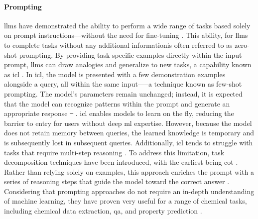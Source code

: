 \documentclass[11pt, oneside]{article}
\makeatletter
\providecommand{\DIFaddtex}[1]{{\protect\color{blue}\uwave{#1}}} %
\providecommand{\DIFdeltex}[1]{{\protect\color{red}\sout{#1}}} %
\providecommand{\DIFaddbegin}{} %
\providecommand{\DIFaddend}{} %
\providecommand{\DIFdelbegin}{} %
\providecommand{\DIFdelend}{} %
\providecommand{\DIFadd}[1]{\texorpdfstring{\DIFaddtex{#1}}{#1}} %
\providecommand{\DIFdel}[1]{\texorpdfstring{\DIFdeltex{#1}}{}} %
\newcommand{\DIFscaledelfig}{0.5}
\newlength{\DIFdelgraphicswidth} %
\newlength{\DIFdelgraphicsheight} %
\newcommand{\DIFaddincludegraphics}[2][]{{\color{blue}\fbox{\DIFOincludegraphics[#1]{#2}}}} %
\newcommand{\DIFdelincludegraphics}[2][]{%
\sbox{\DIFdelgraphicsbox}{\DIFOincludegraphics[#1]{#2}}%
\settoboxwidth{\DIFdelgraphicswidth}{\DIFdelgraphicsbox} %
\settoboxtotalheight{\DIFdelgraphicsheight}{\DIFdelgraphicsbox} %
\scalebox{\DIFscaledelfig}{%
\parbox[b]{\DIFdelgraphicswidth}{\usebox{\DIFdelgraphicsbox}\\[-\baselineskip] \rule{\DIFdelgraphicswidth}{0em}}\llap{\resizebox{\DIFdelgraphicswidth}{\DIFdelgraphicsheight}{%
\setlength{\unitlength}{\DIFdelgraphicswidth}%
\begin{picture}(1,1)%
\thicklines\linethickness{2pt} %
{\color[rgb]{1,0,0}\put(0,0){\framebox(1,1){}}}%
{\color[rgb]{1,0,0}\put(0,0){\line( 1,1){1}}}%
{\color[rgb]{1,0,0}\put(0,1){\line(1,-1){1}}}%
\end{picture}%
}\hspace*{3pt}}} %
} %
\DeclareRobustCommand{\DIFaddbegin}{\DIFOaddbegin \let\includegraphics\DIFaddincludegraphics} %
\DeclareRobustCommand{\DIFaddend}{\DIFOaddend \let\includegraphics\DIFOincludegraphics} %
\DeclareRobustCommand{\DIFdelbegin}{\DIFOdelbegin \let\includegraphics\DIFdelincludegraphics} %
\DeclareRobustCommand{\DIFdelend}{\DIFOaddend \let\includegraphics\DIFOincludegraphics} %
\let\sout@orig\sout %
\renewcommand{\sout}[1]{\ifmmode\text{\sout@orig{\ensuremath{#1}}}\else\sout@orig{#1}\fi} %
\makeatother
\begin{document}
\paragraph{Prompting}\label{sec:prompting} \glspl{llm} have demonstrated the ability to perform a wide range of tasks based solely on prompt instructions---without the need for fine-tuning \autocite{radford2019language}. 
This ability, for \glspl{llm} to complete tasks without any additional information\DIFaddbegin \DIFadd{, }\DIFaddend is often referred to as zero-shot prompting.
By providing task-specific examples directly within the input prompt, \glspl{llm} can draw analogies and generalize to new tasks, a capability known as \gls{icl} \autocite{brown2020language, chowdhery2023palm, openai2023gpt04}. 
In \gls{icl}, the model is presented with a few demonstration examples alongside a query, all within the same input—--a technique known as few-shot prompting. 
The model's parameters remain unchanged; instead, it is expected that the model can recognize patterns within the prompt and generate an appropriate response \DIFdelbegin \DIFdel{\mbox{%
\cite{von2023transformers}}\hskip0pt%
}\DIFdelend \DIFaddbegin \autocite{von2023transformers}\DIFaddend . \gls{icl} enables models to learn on the fly, reducing the barrier to entry for users without deep \gls{ml} expertise. 
However, because the model does not retain memory between queries, the learned knowledge is temporary and is subsequently lost in subsequent queries. 
Additionally, \gls{icl} tends to struggle with tasks that require multi-step reasoning \autocite{brown2020language}. 
To address this limitation, task decomposition techniques have been introduced, with the earliest being \gls{cot} \autocite{wei2022chain}. 
Rather than relying solely on examples, this approach enriches the prompt with a series of reasoning steps that guide the model toward the correct answer \autocite{wei2022chain}. 
Considering that prompting approaches do not require an in-depth understanding of machine learning, they have proven very useful for a range of chemical tasks, including chemical data extraction, \gls{qa}, and property prediction \DIFdelbegin %
\DIFdelend \DIFaddbegin \autocite{liu2025integrating, zheng2023chatgpt, mirza2024large, ramos2023bayesian}\DIFaddend .
\end{document}
